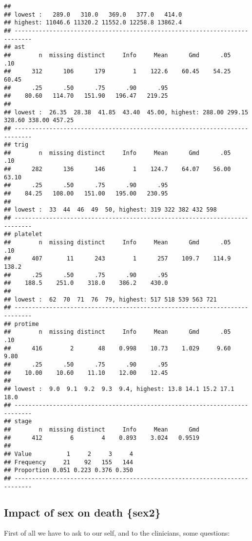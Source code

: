 \documentclass[]{book}
\theoremstyle{definition}
\theoremstyle{definition}
\theoremstyle{definition}
\theoremstyle{remark}
\begin{document}
\begin{verbatim}
## 
## lowest :   289.0   310.0   369.0   377.0   414.0
## highest: 11046.6 11320.2 11552.0 12258.8 13862.4
## ---------------------------------------------------------------------------
## ast 
##        n  missing distinct     Info     Mean      Gmd      .05      .10 
##      312      106      179        1    122.6    60.45    54.25    60.45 
##      .25      .50      .75      .90      .95 
##    80.60   114.70   151.90   196.47   219.25 
## 
## lowest :  26.35  28.38  41.85  43.40  45.00, highest: 288.00 299.15 328.60 338.00 457.25
## ---------------------------------------------------------------------------
## trig 
##        n  missing distinct     Info     Mean      Gmd      .05      .10 
##      282      136      146        1    124.7    64.07    56.00    63.10 
##      .25      .50      .75      .90      .95 
##    84.25   108.00   151.00   195.00   230.95 
## 
## lowest :  33  44  46  49  50, highest: 319 322 382 432 598
## ---------------------------------------------------------------------------
## platelet 
##        n  missing distinct     Info     Mean      Gmd      .05      .10 
##      407       11      243        1      257    109.7    114.9    138.2 
##      .25      .50      .75      .90      .95 
##    188.5    251.0    318.0    386.2    430.0 
## 
## lowest :  62  70  71  76  79, highest: 517 518 539 563 721
## ---------------------------------------------------------------------------
## protime 
##        n  missing distinct     Info     Mean      Gmd      .05      .10 
##      416        2       48    0.998    10.73    1.029     9.60     9.80 
##      .25      .50      .75      .90      .95 
##    10.00    10.60    11.10    12.00    12.45 
## 
## lowest :  9.0  9.1  9.2  9.3  9.4, highest: 13.8 14.1 15.2 17.1 18.0
## ---------------------------------------------------------------------------
## stage 
##        n  missing distinct     Info     Mean      Gmd 
##      412        6        4    0.893    3.024   0.9519 
##                                   
## Value          1     2     3     4
## Frequency     21    92   155   144
## Proportion 0.051 0.223 0.376 0.350
## ---------------------------------------------------------------------------
\end{verbatim}

\subsection{Impact of sex on death
\{sex2\}}\label{impact-of-sex-on-death-sex2}

First of all we have to ask to our self, and to the clinicians, some
questions:
\end{document}
